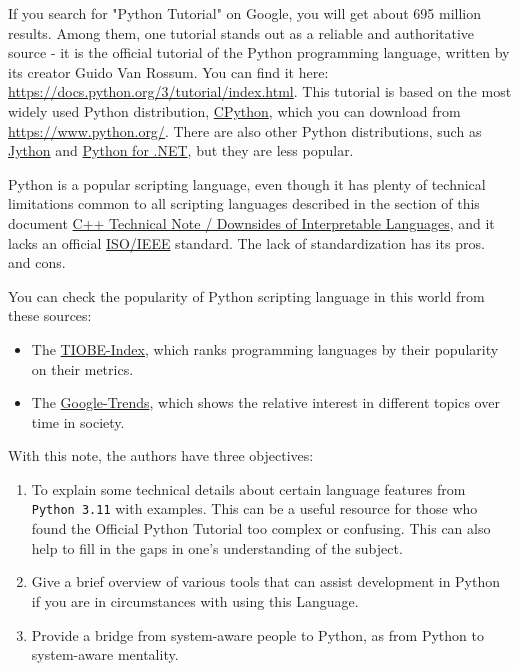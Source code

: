\documentclass[
]{article}
\begin{document}
If you search for "Python Tutorial" on Google, you will get about 695
million results. Among them, one tutorial stands out as a reliable and
authoritative source - it is the official tutorial of the Python
programming language, written by its creator Guido Van Rossum. You can
find it here: \url{https://docs.python.org/3/tutorial/index.html}. This
tutorial is based on the most widely used Python distribution,
\href{https://www.python.org/}{CPython}, which you can download from
\url{https://www.python.org/}. There are also other Python
distributions, such as \href{https://www.jython.org/}{Jython} and
\href{https://pythonnet.github.io/}{Python for .NET}, but they are less
popular.

Python is a popular scripting language, even though it has plenty of
technical limitations common to all scripting languages described in the
section of this document
\href{https://github.com/burlachenkok/CPP_from_1998_to_2020/blob/main/Cpp-Technical-Note.md\#downsides-of-interpretable-languages}{C++
Technical Note / Downsides of Interpretable Languages}, and it lacks an
official \href{https://www.iso.org}{ISO/IEEE} standard. The lack of
standardization has its pros. and cons.

You can check the popularity of Python scripting language in this world
from these sources:

\begin{itemize}
\item
  The \href{https://www.tiobe.com/tiobe-index/}{TIOBE-Index}, which
  ranks programming languages by their popularity on their metrics.
\item
  The
  \href{https://trends.google.com/trends/explore?date=now\%201-d\&q=\%2Fm\%2F05z1_,\%2Fm\%2F0jgqg,C\%23,\%2Fm\%2F07sbkfb,BASH\&hl=r}{Google-Trends},
  which shows the relative interest in different topics over time in
  society.
\end{itemize}

With this note, the authors have three objectives:

\begin{enumerate}
\def\labelenumi{\arabic{enumi}.}
\item
  To explain some technical details about certain language features from
  \texttt{Python\ 3.11} with examples. This can be a useful resource for
  those who found the Official Python Tutorial too complex or confusing.
  This can also help to fill in the gaps in one's understanding of the
  subject.
\item
  Give a brief overview of various tools that can assist development in
  Python if you are in circumstances with using this Language.
\item
  Provide a bridge from system-aware people to Python, as from Python to
  system-aware mentality.
\end{enumerate}
\end{document}
